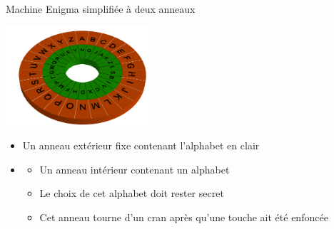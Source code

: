 \begin{frame}
Machine Enigma simplifiée à deux anneaux

{\centering 
            \includegraphics[width=0.4\textwidth]{figures/Enigma_7_bi_unesurune.png} 

}
\pause
\begin{itemize}
  \item Un anneau extérieur fixe contenant l'alphabet  en clair
\pause  
  \item  
  \begin{itemize}
    \item Un anneau intérieur contenant un alphabet 
\pause    
    \item Le choix de cet alphabet  doit rester secret
\pause    
    \item Cet anneau tourne d'un cran après qu'une touche ait été enfoncée
  \end{itemize}

\end{itemize}

\end{frame}



